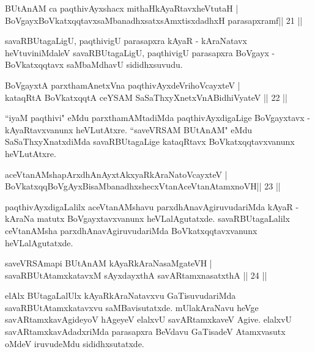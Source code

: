 \begin{shl}
BUtAnAM ca paqthivAyxshacx mithaHkAyaRtavxheVtutaH |\\
BoVgayxBoVkatxqqtavxsaMbanadhxsatxsAmxtisxdadhxH parasapxramf\hfill  || 21 || 
\end{shl}
\begin{artha}
savaRBUtagaLigU, paqthivigU parasapxra kAyaR - kAraNatavx heVtuviniMdaleV savaRBUtagaLigU, paqthivigU parasapxra BoVgayx - BoVkatxqqtavx saMbaMdhavU sididhxsuvudu.
\end{artha}
\begin{shl}
BoVgayxtA parxthamAnetxVna paqthivAyxdeVrihoVcayxteV |\\
kataqRtA BoVkatxqqtA ceYSAM SaSaThxyXnetxVnABidhiVyateV \hfill || 22 || 
\end{shl}
\begin{artha}
``iyaM paqthivi" eMdu parxthamAMtadiMda paqthivAyxdigaLige BoVgayxtavx - kAyaRtavxvanunx heVLutAtxre. ``saveVRSAM BUtAnAM" eMdu SaSaThxyXnatxdiMda savaRBUtagaLige kataqRtavx BoVkatxqqtavxvanunx heVLutAtxre.
\end{artha}
\begin{shl}
aceVtanAMshapArxdhAnAyxtAkxyaRkAraNatoVcayxteV |\\
BoVkatxqqBoVgAyxBisaMbanadhxshecxVtanAceVtanAtamxnoVH\hfill  || 23 || 
\end{shl}
\begin{artha}
paqthivAyxdigaLalilx aceVtanAMshavu parxdhAnavAgiruvudariMda kAyaR - kAraNa matutx BoVgayxtavxvanunx heVLalAgutatxde. savaRBUtagaLalilx ceVtanAMsha parxdhAnavAgiruvudariMda BoVkatxqqtavxvanunx heVLalAgutatxde.
\end{artha}
\begin{shl}
saveVRSAmapi BUtAnAM kAyaRkAraNasaMgateVH |\\
savaRBUtAtamxkatavxM sAyxdayxthA savARtamxnasatxthA \hfill || 24 ||
\end{shl}
\begin{artha}
elAlx BUtagaLalUlx kAyaRkAraNatavxvu GaTisuvudariMda savaRBUtAtamxkatavxvu saMBavisutatxde. mUlakAraNavu heVge savARtamxkavAgideyoV hAgeyeV elalxvU savARtamxkaveV Agive. elalxvU savARtamxkavAdadxriMda parasapxra BeVdavu GaTisadeV Atamxvasutx oMdeV iruvudeMdu sididhxsutatxde.  
\end{artha}
